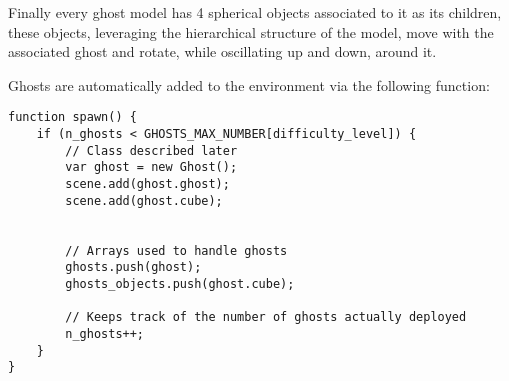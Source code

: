 \documentclass[a4paper,oneside]{report}
\begin{document}
Finally every ghost model has 4 spherical objects associated to it as its children, these objects, leveraging the hierarchical structure of the model, move with the associated ghost and rotate, while oscillating up and down, around it.

Ghosts are automatically added to the environment via the following function: 
\begin{lstlisting}
function spawn() {
    if (n_ghosts < GHOSTS_MAX_NUMBER[difficulty_level]) {
        // Class described later
        var ghost = new Ghost();
        scene.add(ghost.ghost);
        scene.add(ghost.cube);


	    // Arrays used to handle ghosts
        ghosts.push(ghost);
        ghosts_objects.push(ghost.cube);
        
        // Keeps track of the number of ghosts actually deployed
        n_ghosts++;
    }
}
\end{lstlisting}
\end{document}
